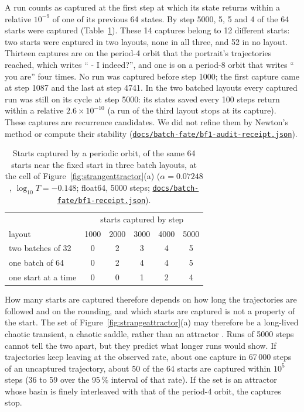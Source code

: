 \documentclass[11pt,letterpaper]{article}
\newcommand{\repourl}{https://github.com/tdj28/neural-shrimp}
\newcommand{\laterrepo}[1]{\href{\repourl/blob/0399fee2e9537a50993482aea8ec417e70286ac4/#1}{\nolinkurl{#1}}}
\begin{document}
A run counts as captured at the first step at which its state returns within a relative $10^{-9}$ of one of its
previous 64 states. By step 5000, 5, 5 and 4 of the 64 starts were captured (Table~\ref{tab:batchfate}). These 14
captures belong to 12 different starts: two starts were captured in two layouts, none in all three, and 52 in no
layout. Thirteen captures are on the period-4 orbit that the portrait's trajectories reached, which writes
`` - I indeed?'', and one is on a period-8 orbit that writes `` you are'' four times. No run was captured before step
1000; the first capture came at step 1087 and the last at step 4741. In the two batched layouts every captured run was
still on its cycle at step 5000: its states saved every 100 steps return within a relative $2.6\times10^{-10}$ (a run
of the third layout stops at its capture). These captures are recurrence candidates. We did not refine them by
Newton's method or compute their stability (\laterrepo{docs/batch-fate/bf1-audit-receipt.json}).
\begin{table}[H]
\centering\small
\begin{tabular}{lccccc}
\toprule
 & \multicolumn{5}{c}{starts captured by step} \\
layout & 1000 & 2000 & 3000 & 4000 & 5000 \\
\midrule
two batches of 32 & 0 & 2 & 3 & 4 & 5 \\
one batch of 64 & 0 & 2 & 4 & 4 & 5 \\
one start at a time & 0 & 0 & 1 & 2 & 4 \\
\bottomrule
\end{tabular}
\caption{Starts captured by a periodic orbit, of the same 64 starts near the fixed start in three batch layouts, at
the cell of Figure~\ref{fig:strangeattractor}(a) ($\alpha=0.07248$, $\log_{10}T=-0.148$; float64, 5000 steps;
\laterrepo{docs/batch-fate/bf1-receipt.json}).}
\label{tab:batchfate}
\end{table}

How many starts are captured therefore depends on how long the trajectories are followed and on the rounding, and
which starts are captured is not a property of the start. The set of Figure~\ref{fig:strangeattractor}(a) may
therefore be a long-lived chaotic transient, a chaotic saddle, rather than an attractor
\cite{grebogi1983crises,lai2011transient}. Runs of 5000 steps cannot tell the two apart, but they predict what longer
runs would show. If trajectories keep leaving at the observed rate, about one capture in 67\,000 steps of an
uncaptured trajectory, about 50 of the 64 starts are captured within $10^5$ steps (36 to 59 over the 95\,\%
interval of that rate). If the set is an attractor whose basin is finely interleaved with that of the period-4 orbit,
the captures stop.
\end{document}
